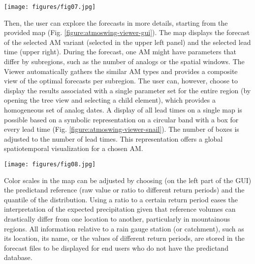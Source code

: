 \documentclass[review]{elsarticle}
\begin{document}
\begin{figure*}[hbt!]
	\texttt{[image: figures/fig07.jpg]}
	\caption{Graphical user interface of the Viewer module (Elevation data from The Shuttle Radar Topography Mission (SRTM), and hydrological network from SwissTopo).}
	\label{figure:atmoswing-viewer-gui}
\end{figure*}

Then, the user can explore the forecasts in more details, starting from the provided map (Fig. \ref{figure:atmoswing-viewer-gui}). The map displays the forecast of the selected AM variant (selected in the upper left panel) and the selected lead time (upper right). During the forecast, one AM might have parameters that differ by subregions, such as the number of analogs or the spatial windows. The Viewer automatically gathers the similar AM types and provides a composite view of the optimal forecasts per subregion. The user can, however, choose to display the results associated with a single parameter set for the entire region (by opening the tree view and selecting a child element), which provides a homogeneous set of analog dates. A display of all lead times on a single map is possible based on a symbolic representation on a circular band with a box for every lead time (Fig. \ref{figure:atmoswing-viewer-snail}). The number of boxes is adjusted to the number of lead times. This representation offers a global spatiotemporal visualization for a chosen AM.

\begin{figure*}[hbt!]
	\texttt{[image: figures/fig08.jpg]}
	\caption{Visualization of multiple lead times on the map (Elevation data from the SRTM, and hydrological network from SwissTopo).}
	\label{figure:atmoswing-viewer-snail}
\end{figure*}

Color scales in the map can be adjusted by choosing (on the left part of the GUI) the predictand reference (raw value or ratio to different return periods) and the quantile of the distribution. Using a ratio to a certain return period eases the interpretation of the expected precipitation given that reference volumes can drastically differ from one location to another, particularly in mountainous regions. All information relative to a rain gauge station (or catchment), such as its location, its name, or the values of different return periods, are stored in the forecast files to be displayed for end users who do not have the predictand database.
\end{document}
